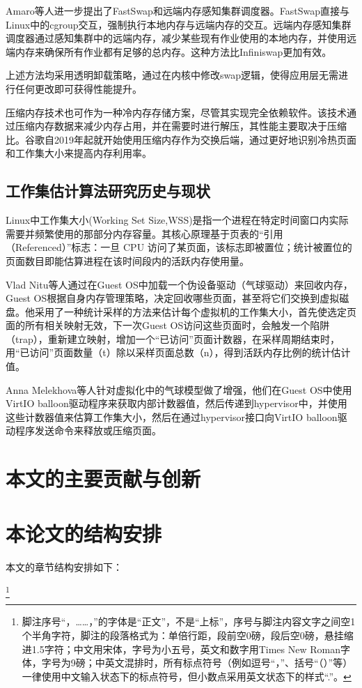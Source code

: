 Amaro等人进一步提出了FastSwap和远端内存感知集群调度器。FastSwap直接与Linux中的cgroup交互，强制执行本地内存与远端内存的交互。远端内存感知集群调度器通过感知集群中的远端内存，减少某些现有作业使用的本地内存，并使用远端内存来确保所有作业都有足够的总内存。这种方法比Infiniswap更加有效。

上述方法均采用透明卸载策略，通过在内核中修改swap逻辑，使得应用层无需进行任何更改即可获得性能提升。

压缩内存技术也可作为一种冷内存存储方案，尽管其实现完全依赖软件。该技术通过压缩内存数据来减少内存占用，并在需要时进行解压，其性能主要取决于压缩比。谷歌自2019年起就开始使用压缩内存作为交换后端，通过更好地识别冷热页面和工作集大小来提高内存利用率。


\subsection{工作集估计算法研究历史与现状}

Linux中工作集大小(Working Set Size,WSS)是指一个进程在特定时间窗口内实际需要并频繁使用的那部分内存容量​。其核心原理基于页表的“引用（Referenced）”标志：一旦 CPU 访问了某页面，该标志即被置位；统计被置位的页面数目即能估算进程在该时间段内的活跃内存使用量。

Vlad Nitu等人通过在Guest OS中加载一个伪设备驱动（气球驱动）来回收内存，Guest OS根据自身内存管理策略，决定回收哪些页面，甚至将它们交换到虚拟磁盘。他采用了一种统计采样的方法来估计每个虚拟机的工作集大小，首先使选定页面的所有相关映射无效，下一次Guest OS访问这些页面时，会触发一个陷阱（trap），重新建立映射，增加一个“已访问”页面计数器，在采样周期结束时，用“已访问”页面数量（t）除以采样页面总数（n），得到活跃内存比例的统计估计值。

Anna Melekhova等人针对虚拟化中的气球模型做了增强，他们在Guest OS中使用VirtIO balloon驱动程序来获取内部计数器值，然后传递到hypervisor中，并使用这些计数器值来估算工作集大小，然后在通过hypervisor接口向VirtIO balloon驱动程序发送命令来释放或压缩页面。

\section{本文的主要贡献与创新}


\section{本论文的结构安排}
本文的章节结构安排如下：

\footnote{脚注序号“，……，”的字体是“正文”，不是“上标”，序号与脚注内容文字之间空1个半角字符，脚注的段落格式为：单倍行距，段前空0磅，段后空0磅，悬挂缩进1.5字符；中文用宋体，字号为小五号，英文和数字用Times New Roman字体，字号为9磅；中英文混排时，所有标点符号（例如逗号“，”、括号“（）”等）一律使用中文输入状态下的标点符号，但小数点采用英文状态下的样式“.”。}